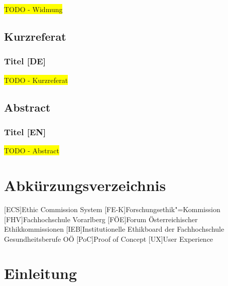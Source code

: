 \documentclass[a4paper,12pt,twoside]{scrreprt}
\begin{document}
\colorbox{yellow}{TODO - Widmung}

\newpage
\section*{Kurzreferat}
\label{sec:abstract-de}

\subsection*{Titel [DE]}

\colorbox{yellow}{TODO - Kurzreferat}

\newpage
\section*{Abstract}
\label{sec:abstract-en}

\subsection*{Titel [EN]}

\colorbox{yellow}{TODO - Abstract}

\cleardoublepage
\tableofcontents

\clearpage
{}
{}
\listoffigures

\clearpage
{}
{}
\chapter*{Abkürzungsverzeichnis}

\begin{acronym}
    [ECS]{Ethic Commission System}
    [FE-K]{Forschungsethik"=Kommission}
    [FHV]{Fachhochschule Vorarlberg}
    [FÖE]{Forum Österreichischer Ethikkommissionen}
    [IEB]{Institutionelle Ethikboard der Fachhochschule Gesundheitsberufe OÖ}
    [PoC]{Proof of Concept}
    [UX]{User Experience}
\end{acronym}

\cleardoublepage
{}

\chapter{Einleitung}
\label{chap:einleitung}
\end{document}
